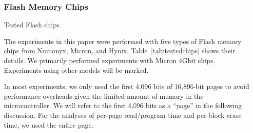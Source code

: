 \subsubsection{Flash Memory Chips}

\begin{table}
  \begin{center}
    
  \end{center}
\caption{Tested Flash chips.}
\vspace{-0.2in}
\label{tab:testedchips}
\end{table}

The experiments in this paper were performed with five types of 
Flash memory chips from Numonyx, Micron, and Hynix. 
Table~\ref{tab:testedchips} shows their details. 
We primarily performed experiments with Micron 4Gbit chips.
Experiments using other models will be marked.

In most experiments, we only used the first 4,096 bits of 16,896-bit pages to
avoid performance overheads given the limited amount of memory in the microcontroller.
We will refer to the first 4,096 bits as a ``page'' in the following discussion.
For the analyses of per-page read/program time and per-block erase time, we
used the entire page.








